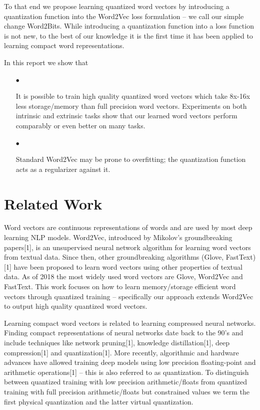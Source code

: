 \documentclass{article} %
\begin{document}
To that end we propose learning quantized word vectors by introducing
a quantization function into the Word2Vec loss formulation -- we call
our simple change Word2Bits. While introducing a quantization function
into a loss function is not new, to the best of our knowledge it is
the first time it has been applied to learning compact word representations.

In this report we show that
\begin{enumerate}
\item[$\bullet$]

  It is possible to train high quality quantized word vectors which
  take 8x-16x less storage/memory than full precision word
  vectors. Experiments on both intrinsic and extrinsic tasks show that
  our learned word vectors perform comparably or even better on many tasks.

\item[$\bullet$]

  Standard Word2Vec may be prone to overfitting; the quantization
  function acts as a regularizer against it.

\end{enumerate}

\section{Related Work}
Word vectors are continuous representations of words and are used by
most deep learning NLP models. Word2Vec, introduced by Mikolov's
groundbreaking papers[1], is an unsupervised neural network algorithm for
learning word vectors from textual data. Since then, other
groundbreaking algorithms (Glove, FastText) [1] have been proposed to
learn word vectors using other properties of textual data. As of 2018
the most widely used word vectors are Glove, Word2Vec and
FastText. This work focuses on how to learn memory/storage efficient
word vectors through quantized training -- specifically our approach
extends Word2Vec to output high quality quantized word vectors.

Learning compact word vectors is related to learning compressed neural
networks. Finding compact representations of neural
networks date back to the 90's and include techniques like network
pruning[1], knowledge distillation[1], deep compression[1] and
quantization[1]. More recently, algorithmic and hardware advances have
allowed training deep models using low precision floating-point and
arithmetic operations[1] -- this is also referred to as
quantization. To distinguish between quantized training with low
precision arithmetic/floats from quantized training with full
precision arithmetic/floats but constrained values we term the first
physical quantization and the latter virtual quantization.
\end{document}
